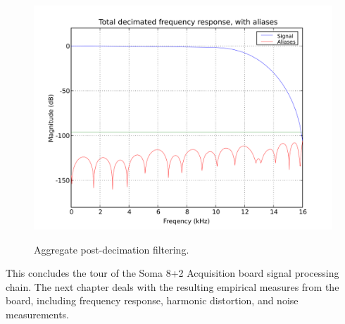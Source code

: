\begin{figure}[h!]
  \includegraphics[scale=0.7]{soma-1.digital.withaliases.svg}
  \label{digital.withaliases}
  \caption{Aggregate post-decimation filtering.}
\end{figure}


This concludes the tour of the Soma 8+2 Acquisition board signal
processing chain. The next chapter deals with the resulting empirical
measures from the board, including frequency response, harmonic
distortion, and noise measurements.
